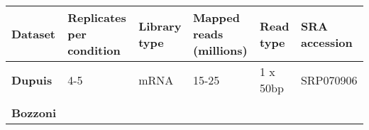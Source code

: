 \begin{longtable}[]{@{}llllll@{}}
	\toprule
	\begin{minipage}[t]{0.14\columnwidth}\raggedright\strut
		{\textbf{Dataset}}\strut
	\end{minipage} & \begin{minipage}[t]{0.14\columnwidth}\raggedright\strut
		{\textbf{Replicates per condition}}\strut
	\end{minipage} & \begin{minipage}[t]{0.14\columnwidth}\raggedright\strut
		{\textbf{Library type}}\strut
	\end{minipage} & \begin{minipage}[t]{0.14\columnwidth}\raggedright\strut
		{\textbf{Mapped reads (millions)}}\strut
	\end{minipage} & \begin{minipage}[t]{0.14\columnwidth}\raggedright\strut
		{\textbf{Read type}}\strut
	\end{minipage} & \begin{minipage}[t]{0.14\columnwidth}\raggedright\strut
		{\textbf{SRA accession}}\strut
	\end{minipage}\tabularnewline\hline 
	\begin{minipage}[t]{0.14\columnwidth}\raggedright\strut
		{\textbf{Dupuis}}\strut
	\end{minipage} & \begin{minipage}[t]{0.14\columnwidth}\raggedright\strut
		{4-5}\strut
	\end{minipage} & \begin{minipage}[t]{0.14\columnwidth}\raggedright\strut
		{mRNA}\strut
	\end{minipage} & \begin{minipage}[t]{0.14\columnwidth}\raggedright\strut
		{15-25}\strut
	\end{minipage} & \begin{minipage}[t]{0.14\columnwidth}\raggedright\strut
		{1 x 50bp}\strut
	\end{minipage} & \begin{minipage}[t]{0.14\columnwidth}\raggedright\strut
		{SRP070906 }\strut
	\end{minipage}\tabularnewline \\
	\begin{minipage}[t]{0.14\columnwidth}\raggedright\strut
		{\textbf{Bozzoni} }\strut
	\end{minipage} & \begin{minipage}[t]{0.14\columnwidth}\raggedright\strut

\end{minipage}
\end{longtable}
